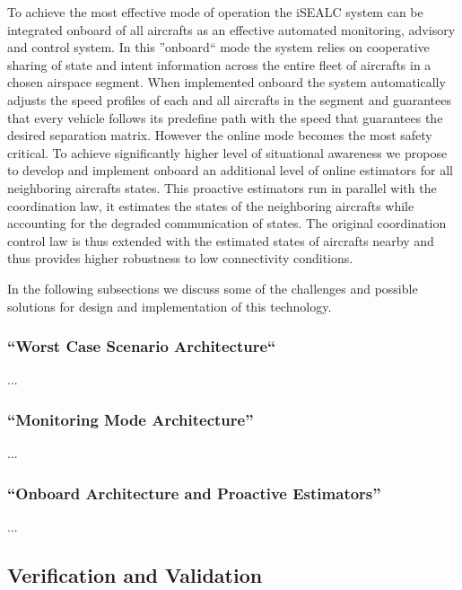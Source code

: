 \documentclass[letter,onecolumn,12pt]{aiaa-tc}
\newcommand{\1}{1_n}
\begin{document}
To achieve the most effective mode of operation the iSEALC system can be integrated onboard of all aircrafts as an effective automated monitoring, advisory and control system. In this ''onboard`` mode the system relies on cooperative sharing of state and intent information across the entire fleet of aircrafts in a chosen airspace segment. When implemented onboard the system automatically adjusts the speed profiles of each and all aircrafts in the segment and guarantees that every vehicle follows its predefine path with the speed that guarantees the desired separation matrix. However the online mode becomes the most safety critical. To achieve significantly higher level of situational awareness we propose to develop and implement onboard an additional level of online estimators for all neighboring aircrafts states. This proactive estimators run in parallel with the coordination law, it estimates the states of the neighboring aircrafts while accounting for the degraded communication of states. The original coordination control law is thus extended with the estimated states of aircrafts nearby and thus provides higher robustness to low connectivity conditions.

In the following subsections we discuss some of the challenges and possible solutions for design and implementation of this technology.


\subsubsection{``Worst Case Scenario Architecture``}

...

\subsubsection{``Monitoring Mode Architecture''}

...

\subsubsection{``Onboard Architecture and Proactive Estimators''}

...
\subsection{Verification and Validation}
\end{document}
